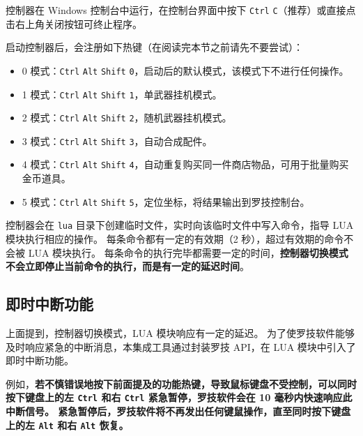 控制器在 Windows 控制台中运行，在控制台界面中按下 \lstinline{Ctrl} \lstinline{C}（推荐）或直接点击右上角关闭按钮可终止程序。

启动控制器后，会注册如下热键（在阅读完本节之前请先不要尝试）：

\begin{itemize}

    \item 0 模式：\lstinline{Ctrl} \lstinline{Alt} \lstinline{Shift} \lstinline{0}，启动后的默认模式，该模式下不进行任何操作。

    \item 1 模式：\lstinline{Ctrl} \lstinline{Alt} \lstinline{Shift} \lstinline{1}，单武器挂机模式。

    \item 2 模式：\lstinline{Ctrl} \lstinline{Alt} \lstinline{Shift} \lstinline{2}，随机武器挂机模式。

    \item 3 模式：\lstinline{Ctrl} \lstinline{Alt} \lstinline{Shift} \lstinline{3}，自动合成配件。

    \item 4 模式：\lstinline{Ctrl} \lstinline{Alt} \lstinline{Shift} \lstinline{4}，自动重复购买同一件商店物品，可用于批量购买金币道具。

    \item 5 模式：\lstinline{Ctrl} \lstinline{Alt} \lstinline{Shift} \lstinline{5}，定位坐标，将结果输出到罗技控制台。

\end{itemize}

控制器会在 \lstinline{lua} 目录下创建临时文件，实时向该临时文件中写入命令，指导 LUA 模块执行相应的操作。
每条命令都有一定的有效期（2 秒），超过有效期的命令不会被 LUA 模块执行。
每条命令的执行完毕都需要一定的时间，\textbf{\color{red}控制器切换模式不会立即停止当前命令的执行，而是有一定的延迟时间}。

\subsection{即时中断功能}

上面提到，控制器切换模式，LUA 模块响应有一定的延迟。
为了使罗技软件能够及时响应紧急的中断消息，本集成工具通过封装罗技 API，在 LUA 模块中引入了即时中断功能。

例如，\textbf{\color{red}若不慎错误地按下前面提及的功能热键，导致鼠标键盘不受控制，可以同时按下键盘上的左 \lstinline{Ctrl} 和右 \lstinline{Ctrl} 紧急暂停，罗技软件会在 10 毫秒内快速响应此中断信号。
紧急暂停后，罗技软件将不再发出任何键鼠操作，直至同时按下键盘上的左 \lstinline{Alt} 和右 \lstinline{Alt} 恢复。}

